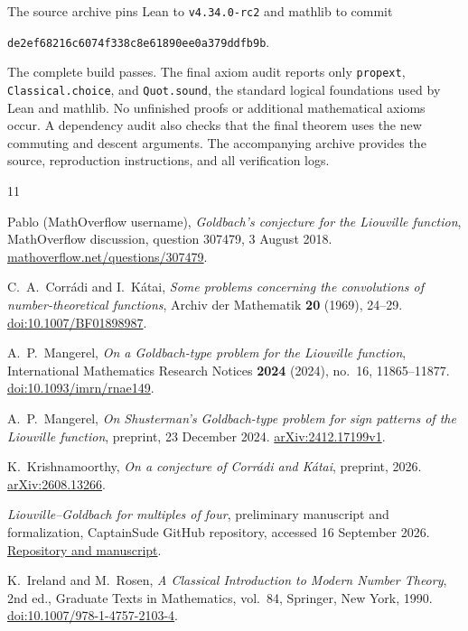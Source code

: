 \documentclass[11pt,a4paper]{article}
\theoremstyle{remark}
\numberwithin{equation}{section}
\newcommand{\code}[1]{\texttt{#1}}
\begin{document}
The source archive pins Lean to \code{v4.34.0-rc2} and mathlib to commit
\begin{center}
\small\code{de2ef68216c6074f338c8e61890ee0a379ddfb9b}.
\end{center}
The complete build passes. The final axiom audit reports only
\code{propext}, \code{Classical.choice}, and \code{Quot.sound}, the
standard logical foundations used by Lean and mathlib. No unfinished
proofs or additional mathematical axioms occur. A dependency audit also
checks that the final theorem uses the new commuting and descent
arguments. The accompanying archive provides the source, reproduction
instructions, and all verification logs.

\begin{thebibliography}{11}
\small
\setlength{\itemsep}{4pt}

Pablo (MathOverflow username),
\emph{Goldbach's conjecture for the Liouville function},
MathOverflow discussion, question 307479, 3 August 2018.
\href{https://mathoverflow.net/questions/307479/goldbachs-conjecture-for-the-liouville-function}{mathoverflow.net/questions/307479}.

C.~A.~Corr\'adi and I.~K\'atai,
\emph{Some problems concerning the convolutions of number-theoretical
functions}, Archiv der Mathematik \textbf{20} (1969), 24--29.
\href{https://doi.org/10.1007/BF01898987}{doi:10.1007/BF01898987}.

A.~P.~Mangerel,
\emph{On a Goldbach-type problem for the Liouville function},
International Mathematics Research Notices \textbf{2024} (2024), no.~16,
11865--11877.
\href{https://doi.org/10.1093/imrn/rnae149}{doi:10.1093/imrn/rnae149}.

A.~P.~Mangerel,
\emph{On Shusterman's Goldbach-type problem for sign patterns of the
Liouville function}, preprint, 23 December 2024.
\href{https://arxiv.org/abs/2412.17199v1}{arXiv:2412.17199v1}.

K.~Krishnamoorthy,
\emph{On a conjecture of Corr\'adi and K\'atai}, preprint, 2026.
\href{https://arxiv.org/abs/2608.13266}{arXiv:2608.13266}.

\emph{Liouville--Goldbach for multiples of four}, preliminary manuscript
and formalization, CaptainSude GitHub repository, accessed 16 September 2026.
\href{https://github.com/CaptainSude/Liouville-Goldbach-Multiples-of-Four}{Repository and manuscript}.

K.~Ireland and M.~Rosen,
\emph{A Classical Introduction to Modern Number Theory}, 2nd ed.,
Graduate Texts in Mathematics, vol.~84, Springer, New York, 1990.
\href{https://doi.org/10.1007/978-1-4757-2103-4}{doi:10.1007/978-1-4757-2103-4}.


\end{thebibliography}
\end{document}
